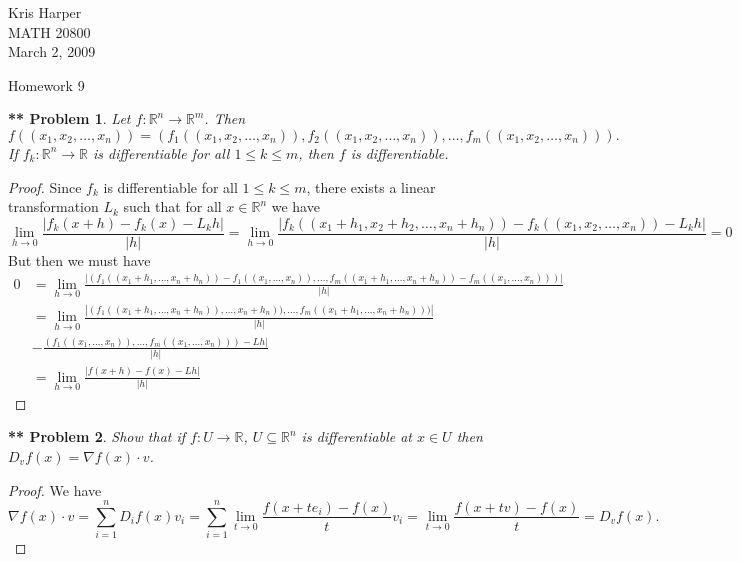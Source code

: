 \documentclass{article}
\newtheorem{**}{** Problem}
\begin{document}
\begin{flushright}
Kris Harper\\

MATH 20800\\

March 2, 2009
\end{flushright}

\begin{center}
Homework 9
\end{center}

\begin{flushleft}

\begin{**}
Let $f : \mathbb{R}^n \rightarrow \mathbb{R}^m$. Then
\[
f((x_1, x_2, \dots , x_n)) = (f_1((x_1, x_2, \dots , x_n)), f_2((x_1, x_2, \dots , x_n)), \dots , f_m((x_1, x_2, \dots , x_n))).
\]
If $f_k : \mathbb{R}^n \rightarrow \mathbb{R}$ is differentiable for all $1 \leq k \leq m$, then $f$ is differentiable.
\end{**}
\begin{proof}
Since $f_k$ is differentiable for all $1 \leq k \leq m$, there exists a linear transformation $L_k$ such that for all $x \in \mathbb{R}^n$ we have
\[
\lim_{h \rightarrow 0} \frac{|f_k(x + h) - f_k(x) - L_kh|}{|h|} = \lim_{h \rightarrow 0} \frac{|f_k((x_1 + h_1, x_2 + h_2, \dots , x_n + h_n)) - f_k((x_1, x_2, \dots , x_n)) - L_kh|}{|h|} = 0
\]
But then we must have
\begin{align*}
0
&= \lim_{h \rightarrow 0} \frac{|(f_1((x_1+h_1, \dots , x_n+h_n))-f_1((x_1, \dots , x_n)), \dots , f_m((x_1+h_1, \dots , x_n+h_n)) - f_m((x_1, \dots , x_n)))|}{|h|}\\
&= \lim_{h \rightarrow 0} \frac{|(f_1((x_1+h_1, \dots , x_n+h_n)), \dots , x_n+h_n)), \dots , f_m((x_1+h_1, \dots , x_n+h_n)))|}{|h|}\\
&- \frac{(f_1((x_1, \dots , x_n)), \dots , f_m((x_1, \dots , x_n))) - Lh|}{|h|}\\
&= \lim_{h \rightarrow 0} \frac{|f(x + h) - f(x) - Lh|}{|h|}
\end{align*}
\end{proof}

\begin{**}
Show that if $f : U \rightarrow \mathbb{R}$, $U \subseteq \mathbb{R}^n$ is differentiable at $x \in U$ then $D_v f(x) = \nabla f(x) \cdot v$.
\end{**}
\begin{proof}
We have
\[
\nabla f(x) \cdot v = \sum_{i=1}^n D_if(x)v_i = \sum_{i=1}^n \lim_{t \rightarrow 0} \frac{f(x + te_i) - f(x)}{t} v_i = \lim_{t \rightarrow 0} \frac{f(x+tv) - f(x)}{t} = D_vf(x).
\]
\end{proof}


\end{flushleft}
\end{document}
